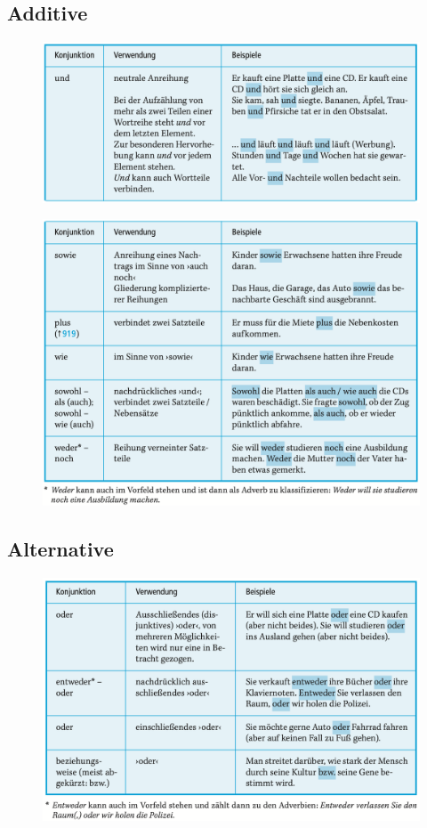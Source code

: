 \documentclass[UTF8]{report}
\begin{document}
\subsection{Additive}
\begin{figure}[H]
    \centering
    \includegraphics[scale=0.6]{add1.png}
\end{figure}
\begin{figure}[H]
    \centering
    \includegraphics[scale=0.55]{add2.png}
\end{figure}


\subsection{Alternative}
\begin{figure}[H]
    \centering
    \includegraphics[scale=0.55]{alt.png}
\end{figure}
\end{document}
